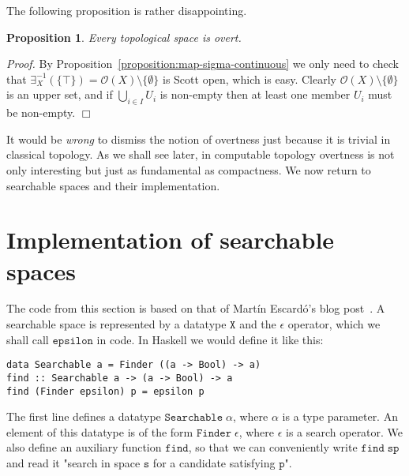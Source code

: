 \documentclass[a4paper,10pt]{article}
\newtheorem{proposition}[theorem]{Proposition}
\newenvironment{proof}{\par\noindent\textit{Proof.}}{\hfill$\Box$\par\medskip}
\newcommand{\set}[1]{\{#1\}}
\newcommand{\tpl}[1]{\mathcal{O}(#1)}
\newcommand{\R}[1]{\mathtt{#1}}
\begin{document}
The following proposition is rather disappointing.

\begin{proposition} Every topological space is overt.
\end{proposition}

\begin{proof} By Proposition~\ref{proposition:map-sigma-continuous} we only
need to check that $\exists_X^{-1}(\set{\top}) = \tpl{X} \setminus
\set{\emptyset}$ is Scott open, which is easy. Clearly $\tpl{X} \setminus
\set{\emptyset}$ is an upper set, and if $\bigcup_{i \in I} U_i$ is non-empty
then at least one member $U_i$ must be non-empty.
\end{proof}

It would be \emph{wrong} to dismiss the notion of overtness just because it is
trivial in classical topology. As we shall see later, in computable topology
overtness is not only interesting but just as fundamental as compactness. We
now return to searchable spaces and their implementation.

\section{Implementation of searchable spaces}
\label{sec:implementation-searchable}

The code from this section is based on that of Martín Escardó's blog
post~\cite{escardo08:blog}. A searchable space is represented by a datatype
$\mathtt{X}$ and the $\epsilon$ operator, which we shall call $\R{epsilon}$ in
code. In Haskell we would define it like this:
% 
\begin{lstlisting}
data Searchable a = Finder ((a -> Bool) -> a)
find :: Searchable a -> (a -> Bool) -> a
find (Finder epsilon) p = epsilon p
\end{lstlisting}
% 
The first line defines a datatype $\mathtt{Searchable}\;\alpha$, where
$\alpha$ is a type parameter. An element of this datatype is of the form
$\mathtt{Finder}\;\epsilon$, where $\epsilon$ is a search operator. We also
define an auxiliary function $\mathtt{find}$, so that we can conveniently
write $\R{find}\;\R{s}\R{p}$ and read it "search in space $\R{s}$ for a
candidate satisfying $\R{p}$".
\end{document}
